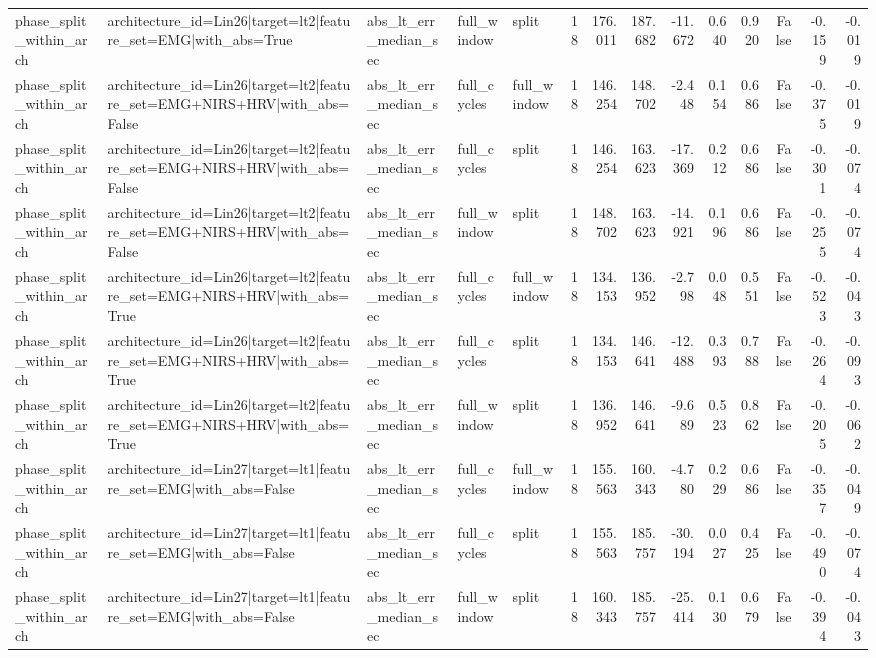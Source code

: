 \begin{table}
\begin{tabular}{lllllrrrrrrrrr}
phase_split_within_arch & architecture_id=Lin26|target=lt2|feature_set=EMG|with_abs=True & abs_lt_err_median_sec & full_window & split & 18 & 176.011 & 187.682 & -11.672 & 0.640 & 0.920 & False & -0.159 & -0.019 \\
phase_split_within_arch & architecture_id=Lin26|target=lt2|feature_set=EMG+NIRS+HRV|with_abs=False & abs_lt_err_median_sec & full_cycles & full_window & 18 & 146.254 & 148.702 & -2.448 & 0.154 & 0.686 & False & -0.375 & -0.019 \\
phase_split_within_arch & architecture_id=Lin26|target=lt2|feature_set=EMG+NIRS+HRV|with_abs=False & abs_lt_err_median_sec & full_cycles & split & 18 & 146.254 & 163.623 & -17.369 & 0.212 & 0.686 & False & -0.301 & -0.074 \\
phase_split_within_arch & architecture_id=Lin26|target=lt2|feature_set=EMG+NIRS+HRV|with_abs=False & abs_lt_err_median_sec & full_window & split & 18 & 148.702 & 163.623 & -14.921 & 0.196 & 0.686 & False & -0.255 & -0.074 \\
phase_split_within_arch & architecture_id=Lin26|target=lt2|feature_set=EMG+NIRS+HRV|with_abs=True & abs_lt_err_median_sec & full_cycles & full_window & 18 & 134.153 & 136.952 & -2.798 & 0.048 & 0.551 & False & -0.523 & -0.043 \\
phase_split_within_arch & architecture_id=Lin26|target=lt2|feature_set=EMG+NIRS+HRV|with_abs=True & abs_lt_err_median_sec & full_cycles & split & 18 & 134.153 & 146.641 & -12.488 & 0.393 & 0.788 & False & -0.264 & -0.093 \\
phase_split_within_arch & architecture_id=Lin26|target=lt2|feature_set=EMG+NIRS+HRV|with_abs=True & abs_lt_err_median_sec & full_window & split & 18 & 136.952 & 146.641 & -9.689 & 0.523 & 0.862 & False & -0.205 & -0.062 \\
phase_split_within_arch & architecture_id=Lin27|target=lt1|feature_set=EMG|with_abs=False & abs_lt_err_median_sec & full_cycles & full_window & 18 & 155.563 & 160.343 & -4.780 & 0.229 & 0.686 & False & -0.357 & -0.049 \\
phase_split_within_arch & architecture_id=Lin27|target=lt1|feature_set=EMG|with_abs=False & abs_lt_err_median_sec & full_cycles & split & 18 & 155.563 & 185.757 & -30.194 & 0.027 & 0.425 & False & -0.490 & -0.074 \\
phase_split_within_arch & architecture_id=Lin27|target=lt1|feature_set=EMG|with_abs=False & abs_lt_err_median_sec & full_window & split & 18 & 160.343 & 185.757 & -25.414 & 0.130 & 0.679 & False & -0.394 & -0.043 \\

\end{tabular}
\end{table}
